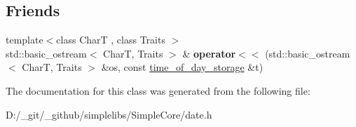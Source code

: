 \subsection*{Friends}
\begin{DoxyCompactItemize}
\item 
\mbox{\label{classdate_1_1detail_1_1time__of__day__storage_3_01std_1_1chrono_1_1duration_3_01_rep_00_01_periof6e2d5ee0d1e3852f1e52c62f81e1bb7_aa723ed987ab639045a035ce6020dfb3d}} 
{\footnotesize template$<$class CharT , class Traits $>$ }\\std\+::basic\+\_\+ostream$<$ CharT, Traits $>$ \& {\bfseries operator$<$$<$} (std\+::basic\+\_\+ostream$<$ CharT, Traits $>$ \&os, const \mbox{\hyperlink{classdate_1_1detail_1_1time__of__day__storage}{time\+\_\+of\+\_\+day\+\_\+storage}} \&t)
\end{DoxyCompactItemize}


The documentation for this class was generated from the following file\+:\begin{DoxyCompactItemize}
\item 
D\+:/\+\_\+git/\+\_\+github/simplelibs/\+Simple\+Core/date.\+h\end{DoxyCompactItemize}
